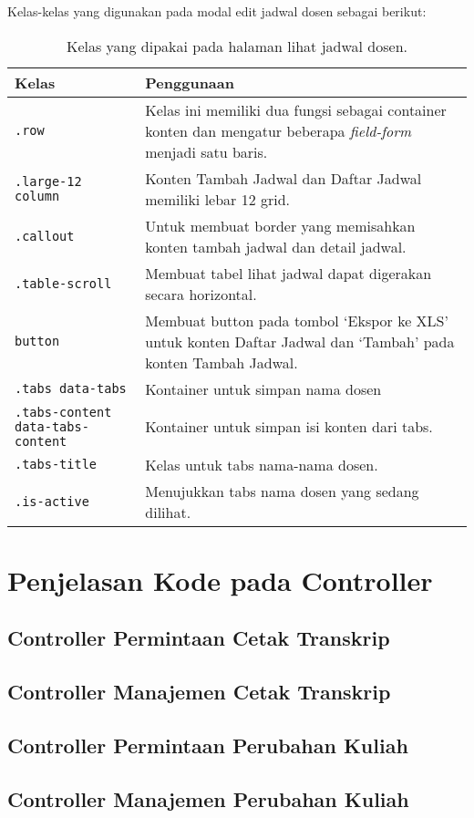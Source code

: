 \noindent Kelas-kelas yang digunakan pada modal edit jadwal dosen sebagai berikut:
\begin{table}[H]
	\centering
	\begin{tabularx}{\textwidth}{lX}
		\toprule
		Kelas     & Penggunaan \\
		\midrule
		\texttt{.row} & Kelas ini memiliki dua fungsi sebagai container konten dan mengatur beberapa \textit{field-form} menjadi satu baris. \\
		\texttt{.large-12 column} & Konten Tambah Jadwal dan Daftar Jadwal memiliki lebar 12 grid.\\
		\texttt{.callout} & Untuk membuat border yang memisahkan konten tambah jadwal dan detail jadwal.\\
		\texttt{.table-scroll} & Membuat tabel lihat jadwal dapat digerakan secara horizontal.\\
		\texttt{button} & Membuat button pada tombol `Ekspor ke XLS' untuk konten Daftar Jadwal dan `Tambah' pada konten Tambah Jadwal.	\\
		\texttt{.tabs data-tabs} & Kontainer untuk simpan nama dosen\\
		\texttt{.tabs-content data-tabs-content} & Kontainer untuk simpan isi konten dari tabs.\\
		\texttt{.tabs-title} & Kelas untuk tabs nama-nama dosen.\\
		\texttt{.is-active} & Menujukkan tabs nama dosen yang sedang dilihat.\\
		\bottomrule
	\end{tabularx}%
	\caption{Kelas yang dipakai pada halaman lihat jadwal dosen.}
\end{table}

\section{Penjelasan Kode pada Controller}
\subsection{Controller Permintaan Cetak Transkrip}
\subsection{Controller Manajemen Cetak Transkrip}
\subsection{Controller Permintaan Perubahan Kuliah}
\subsection{Controller Manajemen Perubahan Kuliah}

